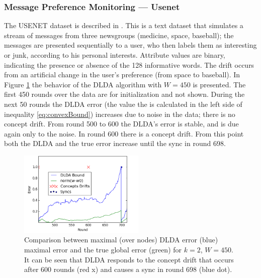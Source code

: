 \documentclass[11pt,twocolumn,varwidth=true,a4paper,fleqn]{article}
\begin{document}
\subsubsection{Message Preference Monitoring --- Usenet}
The USENET dataset is described in \cite{usenet}.
This is a text dataset that simulates a stream of messages from three newsgroups
(medicine, space, baseball); the messages are presented sequentially to a user, 
who then labels them as interesting or junk, according to his personal interests. 
Attribute values are binary, indicating the presence or absence of the 128
informative words. The drift occurs from an artificial change in the user's
preference (from space to baseball). In Figure \ref{usenet} the behavior of the
DLDA algorithm with $W=450$ is presented. The first 450 rounds over the data are for
initialization and not shown. During the next 50 rounds the DLDA error 
(the value the is calculated in the left side of inequality
\ref{eq:convexBound}) increases due to noise in the data; there is
no concept drift. From round 500 to 600 the DLDA's error is stable, 
and is due again only to the noise. In round 600 there is a concept 
drift.
From this point both the DLDA and the true error increase until the 
sync in round 698.

\begin{figure}[h]
	\centering
	\includegraphics[width=60mm]{Usenet/DriftDetected.png}
	\caption{Comparison between maximal (over nodes) DLDA error (blue) maximal
	error and the true global error (green) for $k=2$, $W=450$. 
	It can be seen that DLDA responds to the concept drift that occurs 
	after 600 rounds (red x) and causes a sync in round 698 (blue dot).}
	\label{usenet}
	\end{figure}
	
\end{document}
